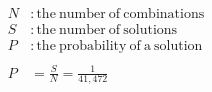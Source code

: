 \documentclass[preview, border=2mm]{standalone}
\begin{document}
\vspace*{\fill}

{\fontsize{32pt}{40pt}\selectfont
    \begin{align*}
    N &: \mathrm{the\ number\ of\ combinations} \\
    S &: \mathrm{the\ number\ of\ solutions} \\
    P &: \mathrm{the\ probability\ of\ a\ solution} \\
    \\
    P &= \frac{S}{N} = \frac{1}{41,472}
    \end{align*}
}

\vspace*{\fill}
\end{document}
